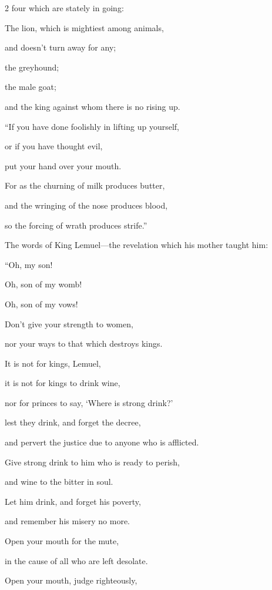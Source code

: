 \begin{multicols}{2}
four which are stately in going:


\myverse{}The lion, which is mightiest among animals,

and doesn’t turn away for any;


\myverse{}the greyhound;

the male goat;

and the king against whom there is no rising up.


\vspace{\baselineskip} 
\myverse{}“If you have done foolishly in lifting up yourself,

or if you have thought evil,

put your hand over your mouth.


\myverse{}For as the churning of milk produces butter,

and the wringing of the nose produces blood,

so the forcing of wrath produces strife.”


\mychapter{} \myverse*{}The words of King Lemuel—the revelation which his mother taught
him:


\vspace{\baselineskip} 
\myverse{}“Oh, my son!

Oh, son of my womb!

Oh, son of my vows!


\myverse{}Don’t give your strength to women,

nor your ways to that which destroys kings.


\myverse{}It is not for kings, Lemuel,

it is not for kings to drink wine,

nor for princes to say, ‘Where is strong drink?’


\myverse{}lest they drink, and forget the decree,

and pervert the justice due to anyone who is afflicted.


\myverse{}Give strong drink to him who is ready to perish,

and wine to the bitter in soul.


\myverse{}Let him drink, and forget his poverty,

and remember his misery no more.


\myverse{}Open your mouth for the mute,

in the cause of all who are left desolate.


\myverse{}Open your mouth, judge righteously,


\end{multicols}

